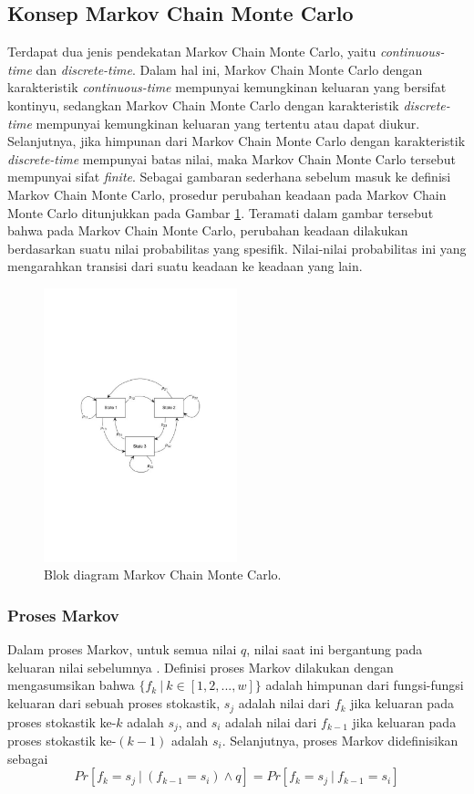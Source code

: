 {{{{{{\subsection{Konsep Markov Chain Monte Carlo}
Terdapat dua jenis pendekatan Markov Chain Monte Carlo, yaitu \textit{continuous-time} dan \textit{discrete-time}. Dalam hal ini, Markov Chain Monte Carlo dengan karakteristik \textit{continuous-time} mempunyai kemungkinan keluaran yang bersifat kontinyu, sedangkan Markov Chain Monte Carlo dengan karakteristik \textit{discrete-time} mempunyai kemungkinan keluaran yang tertentu atau dapat diukur. Selanjutnya, jika himpunan dari Markov Chain Monte Carlo dengan karakteristik \textit{discrete-time} mempunyai batas nilai, maka Markov Chain Monte Carlo tersebut mempunyai sifat \textit{finite}. Sebagai gambaran sederhana sebelum masuk ke definisi Markov Chain Monte Carlo, prosedur perubahan keadaan pada Markov Chain Monte Carlo ditunjukkan pada Gambar \ref{diagramMCMC}. Teramati dalam gambar tersebut bahwa pada Markov Chain Monte Carlo, perubahan keadaan dilakukan berdasarkan suatu nilai probabilitas yang spesifik. Nilai-nilai probabilitas ini yang mengarahkan transisi dari suatu keadaan ke keadaan yang lain.

\begin{figure}[!h]
	\centering
	\includegraphics[width=0.5\textwidth]{Fig/diagramMCMC}
	\caption{Blok diagram Markov Chain Monte Carlo.}
	\label{diagramMCMC}
\end{figure}

\subsubsection{Proses Markov}
Dalam proses Markov, untuk semua nilai $q$, nilai saat ini bergantung pada keluaran nilai sebelumnya \cite{Revuz1984}. Definisi proses Markov dilakukan dengan mengasumsikan bahwa $\{f_k\ |\ k \in [1,2,...,w]\}$ adalah himpunan dari fungsi-fungsi keluaran dari sebuah proses stokastik, $s_j$ adalah nilai dari $f_k$ jika keluaran pada proses stokastik ke-$k$ adalah $s_j$, and $s_i$ adalah nilai dari $f_{k-1}$ jika keluaran pada proses stokastik ke-$(k-1)$ adalah $s_i$. Selanjutnya, proses Markov didefinisikan sebagai 
\begin{equation}
Pr[f_k=s_j\ |\ (f_{k-1}=s_i)\wedge q]=Pr[f_k=s_j\ |\ f_{k-1}=s_i]\label{fmc}
\end{equation}
}}}}}}
